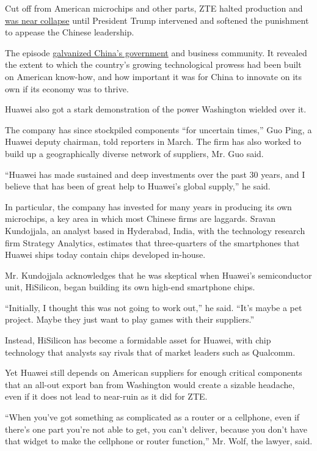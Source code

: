 Cut off from American microchips and other parts, ZTE halted production
and
\href{https://www.nytimes.com/2018/05/09/technology/zte-china-us-trade-war.html}{was
near collapse} until President Trump intervened and softened the
punishment to appease the Chinese leadership.

The episode
\href{https://www.nytimes.com/2018/06/10/technology/china-technology-zte-sputnik-moment.html}{galvanized
China's government} and business community. It revealed the extent to
which the country's growing technological prowess had been built on
American know-how, and how important it was for China to innovate on its
own if its economy was to thrive.

Huawei also got a stark demonstration of the power Washington wielded
over it.

The company has since stockpiled components ``for uncertain times,'' Guo
Ping, a Huawei deputy chairman, told reporters in March. The firm has
also worked to build up a geographically diverse network of suppliers,
Mr. Guo said.

``Huawei has made sustained and deep investments over the past 30 years,
and I believe that has been of great help to Huawei's global supply,''
he said.

In particular, the company has invested for many years in producing its
own microchips, a key area in which most Chinese firms are laggards.
Sravan Kundojjala, an analyst based in Hyderabad, India, with the
technology research firm Strategy Analytics, estimates that
three-quarters of the smartphones that Huawei ships today contain chips
developed in-house.

Mr. Kundojjala acknowledges that he was skeptical when Huawei's
semiconductor unit, HiSilicon, began building its own high-end
smartphone chips.

``Initially, I thought this was not going to work out,'' he said. ``It's
maybe a pet project. Maybe they just want to play games with their
suppliers.''

Instead, HiSilicon has become a formidable asset for Huawei, with chip
technology that analysts say rivals that of market leaders such as
Qualcomm.

Yet Huawei still depends on American suppliers for enough critical
components that an all-out export ban from Washington would create a
sizable headache, even if it does not lead to near-ruin as it did for
ZTE.

``When you've got something as complicated as a router or a cellphone,
even if there's one part you're not able to get, you can't deliver,
because you don't have that widget to make the cellphone or router
function,'' Mr. Wolf, the lawyer, said.

